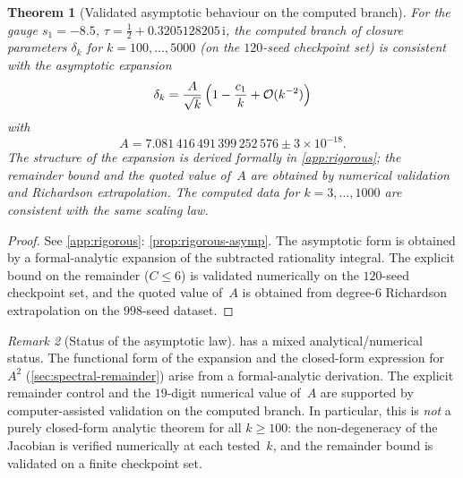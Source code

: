 \documentclass[11pt,a4paper]{article}
\theoremstyle{plain}
\newtheorem{theorem}{Theorem}[section]
\theoremstyle{definition}
\theoremstyle{remark}
\newtheorem{remark}[theorem]{Remark}
\newcommand{\ii}{\mathrm{i}}
\newcommand{\Oo}{\mathcal{O}}
\begin{document}
\begin{theorem}[Validated asymptotic behaviour on the
  computed branch]\label{thm:asymptotic}
  For the gauge $s_1 = -8.5$, $\tau = \tfrac12 + 0.3205128205\,\ii$,
  the computed branch of closure parameters
  $\delta_k$ for $k = 100,\ldots,5000$ (on the $120$-seed checkpoint
  set) is consistent with the asymptotic expansion
  \begin{equation}
    \delta_k = \frac{A}{\sqrt{k}}\,
      \Bigl(1 - \frac{c_1}{k}
      + \Oo(k^{-2})\Bigr)
    \label{eq:asymptotic}
  \end{equation}
  with
  \begin{equation}
    A = 7.081\,416\,491\,399\,252\,576 \pm 3 \times 10^{-18}.
    \label{eq:A}
  \end{equation}
  The structure of the expansion is derived formally in
  \cref{app:rigorous}; the remainder bound and the quoted value
  of~$A$ are obtained by numerical validation and Richardson
  extrapolation.
  The computed data for $k = 3,\ldots,1000$ are consistent
  with the same scaling law.
\end{theorem}
\begin{proof}
  See \cref{app:rigorous}: \cref{prop:rigorous-asymp}.
  The asymptotic form is obtained by a formal-analytic expansion
  of the subtracted rationality integral.
  The explicit bound on the remainder ($C \le 6$) is validated
  numerically on the $120$-seed checkpoint set, and the quoted
  value of~$A$ is obtained from degree-$6$ Richardson
  extrapolation on the $998$-seed dataset.
\end{proof}

\begin{remark}[Status of the asymptotic law]
   has a mixed analytical/numerical status.
  The functional form of the expansion and the closed-form expression
  for~$A^2$ (\cref{sec:spectral-remainder}) arise from a
  formal-analytic derivation.
  The explicit remainder control and the $19$-digit numerical value
  of~$A$ are supported by computer-assisted validation on the
  computed branch.  In particular, this is \emph{not} a purely
  closed-form analytic theorem for all $k \ge 100$: the
  non-degeneracy of the Jacobian is verified numerically at each
  tested~$k$, and the remainder bound is validated on a finite
  checkpoint set.
\end{remark}
\end{document}
